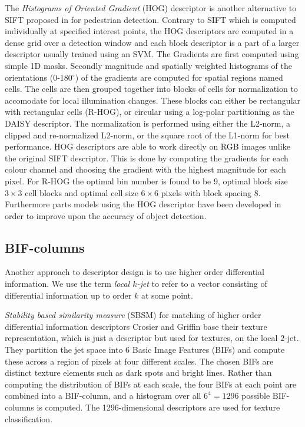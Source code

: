 \documentclass[thesis.tex]{subfiles}
\begin{document}
The \emph{Histograms of Oriented Gradient} (HOG) descriptor is another
alternative to SIFT proposed in \cite{dalal2005histograms} for pedestrian
detection. Contrary to SIFT which is computed individually at specified
interest points, the HOG descriptors are computed in a dense grid over a
detection window and each block descriptor is a part of a larger descriptor
usually trained using an SVM. The Gradients are first computed using simple
1D masks. Secondly magnitude and spatially weighted histograms of the
orientations (0-180$^{\circ}$) of the gradients are computed for spatial
regions named cells. The cells are
then grouped together into blocks of cells for normalization to accomodate
for local illumination changes. These blocks can either be rectangular with
rectangular cells (R-HOG), or circular using a log-polar partitioning as the
DAISY descriptor. The normalization is performed using either the L2-norm,
a clipped and re-normalized L2-norm, or the square root of the L1-norm for
best performance. HOG descriptors are able to work directly on RGB images
unlike the original SIFT descriptor. This is done by computing the gradients
for each colour channel and choosing the gradient with the highest magnitude
for each pixel. For R-HOG the optimal bin number is found to be 9, optimal
block size $3\times3$ cell blocks and optimal cell size $6\times6$ pixels
with block spacing 8.
Furthermore parts models using the HOG descriptor have been developed
\cite{felzenszwalb2008discriminatively} in order to improve upon the accuracy
of object detection.

\subsection{BIF-columns}

Another approach to descriptor design is to use higher order differential
information.
We use the term \emph{local $k$-jet} to refer to a vector
consisting of differential information up to order $k$ at some point.

\emph{Stability based similarity measure} (SBSM) \cite{balmashnova2008novel} for
matching of higher order differential information descriptors
Crosier and Griffin \cite{crosier2010using} base their texture representation, which
is just a descriptor but used for textures, on the local $2$-jet. They
partition the jet space into 6 Basic Image Features (BIFs) and compute these
across a region of pixels at four different scales. The chosen BIFs are
distinct texture elements such as dark spots and bright lines. Rather than
computing the distribution of BIFs at each scale, the four BIFs at each point
are combined into a BIF-column, and a histogram over all $6^4 = 1296$ possible
BIF-columns is computed. The 1296-dimensional descriptors are used for texture
classification.
\end{document}
